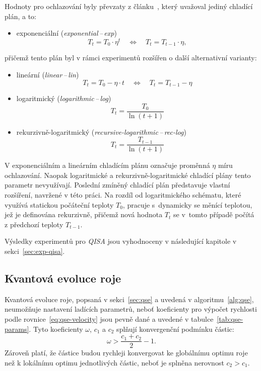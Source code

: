 Hodnoty pro ochlazování byly převzaty z článku~\cite{qisa}, který uvažoval jediný chladící plán, a to:
\begin{itemize}
    \item exponenciální (\emph{exponential\,--\,exp})~\cite{qisa,sa-cooling}
    \begin{equation}\label{eq:qisa-exp}
        T_t = T_0 \cdot \eta^t \quad\Longleftrightarrow\quad T_t = T_{t-1} \cdot \eta,
    \end{equation}
\end{itemize}
přičemž tento plán byl v rámci experimentů rozšířen o další alternativní varianty:
\begin{itemize}
    \item lineární (\emph{linear\,--\,lin})~\cite{sa-cooling}
    \begin{equation}\label{eq:qisa-lin}
        T_t = T_0 - \eta \cdot t \quad\Longleftrightarrow\quad T_t = T_{t-1} - \eta
    \end{equation}
    \item logaritmický (\emph{logarithmic\,--\,log})~\cite{metaheuristics,sa-cooling, banchs_simulated_annealing}
    \begin{equation}\label{eq:qisa-log}
        T_t = \frac{T_0}{\ln\left(t+1\right)}
    \end{equation}
    \item rekurzivně-logaritmický (\emph{recursive-logarithmic\,--\,rec-log})
    \begin{equation}\label{eq:qisa-rec-log}
        T_t = \frac{T_{t-1}}{\ln\left(t+1\right)}
    \end{equation}
\end{itemize}
V exponenciálním a lineárním chladícím plánu označuje proměnná $\eta$ míru ochlazování. 
Naopak logaritmické a rekurzivně-logaritmické chladící plány tento parametr nevyužívají. 
Poslední zmíněný chladící plán představuje vlastní rozšíření, navržené v této práci. 
Na rozdíl od logaritmického schématu, které využívá statickou počáteční teploty $T_0$, pracuje s~dynamicky se měnící teplotou, jež je definována rekurzivně, přičemž nová hodnota $T_t$ se v~tomto případě počítá z předchozí teploty $T_{t-1}$.

Výsledky experimentů pro \emph{QISA} jsou vyhodnoceny v následující kapitole v sekci~\ref{sec:exp-qisa}.

\subsection*{Kvantová evoluce roje}
Kvantová evoluce roje, popsaná v sekci~\ref{sec:qse} a uvedená v algoritmu~\ref{alg:qse}, neumožňuje nastavení ladících parametrů, neboť koeficienty pro výpočet rychlosti podle rovnice~\ref{eq:qse-velocity} jsou pevně dané a uvedené v tabulce~\ref{tab:qse-params}.
Tyto koeficienty $\omega$, $c_1$ a $c_2$ splňují konvergenční podmínku částic:
\begin{equation*}
    \omega > \frac{c_1 + c_2}{2} - 1.
\end{equation*}
Zároveň platí, že částice budou rychleji konvergovat ke globálnímu optimu roje než k lokálnímu optimu jednotlivých částic, neboť je splněna nerovnost $c_2 > c_1$. 

